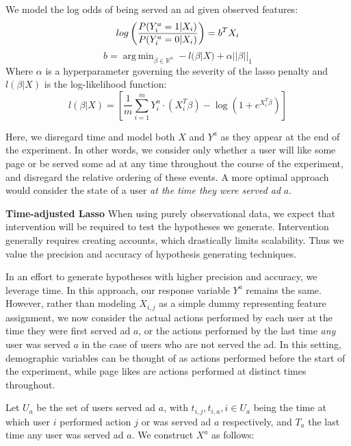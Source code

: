 \documentclass[]{article}
\DeclareMathOperator*{\argmin}{arg\,min}
\begin{document}
We model the log odds of being served an ad given observed features:
\begin{equation}
log \left( \frac{P(Y^a_i = 1 | X_i)}{P(Y^a_i = 0 | X_i)} \right) = b^T X_i\\
\end{equation} \begin{equation}
b = \argmin_{\beta \in \mathbb{R}^{n}} - l(\beta | X) + \alpha||\beta||_1
\end{equation} Where \(\alpha\) is a hyperparameter governing the
severity of the lasso penalty and \(l(\beta | X)\) is the log-likelihood
function: \begin{equation}
l(\beta | X) = \left[\frac{1}{m} \sum_{i=1}^m Y^a_i \cdot (X_i^T \beta) - \log (1+e^{X_i^T \beta})\right]
\end{equation}

Here, we disregard time and model both \(X\) and \(Y^a\) as they appear
at the end of the experiment. In other words, we consider only whether a
user will like some page or be served some ad at any time throughout the
course of the experiment, and disregard the relative ordering of these
events. A more optimal approach would consider the state of a user
\textit{at the time they were served ad} \(a\).

\textbf{Time-adjusted Lasso} When using purely observational data, we
expect that intervention will be required to test the hypotheses we
generate. Intervention generally requires creating accounts, which
drastically limits scalability. Thus we value the precision and accuracy
of hypothesis generating techniques.

In an effort to generate hypotheses with higher precision and accuracy,
we leverage time. In this approach, our response variable \(Y^a\)
remains the same. However, rather than modeling \(X_{i,j}\) as a simple
dummy representing feature assignment, we now consider the actual
actions performed by each user at the time they were first served ad
\(a\), or the actions performed by the last time \textit{any} user was
served \(a\) in the case of users who are not served the ad. In this
setting, demographic variables can be thought of as actions performed
before the start of the experiment, while page likes are actions
performed at distinct times throughout.

Let \(U_a\) be the set of users served ad \(a\), with
\(t_{i,j}, t_{i,a}, i \in U_a\) being the time at which user \(i\)
performed action \(j\) or was served ad \(a\) respectively, and \(T_a\)
the last time any user was served ad \(a\). We construct \(X^a\) as
follows:
\end{document}
